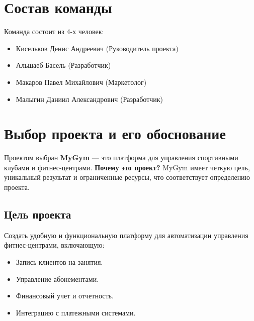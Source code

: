 \documentclass[14pt, russian]{matmex-diploma-custom}
\begin{document}

\maketitle

\section{Состав команды}
Команда состоит из 4-х человек:
\begin{itemize}
    \item Кисельков Денис Андреевич (Руководитель проекта)
    \item Альшаеб Басель (Разработчик)
    \item Макаров Павел Михайлович (Маркетолог)
    \item Малыгин Даниил Александрович (Разработчик)
\end{itemize}

\section{Выбор проекта и его обоснование}
Проектом выбран \textbf{MyGym} — это платформа для управления спортивными клубами и фитнес-центрами.\newline
\textbf{Почему это проект?} MyGym имеет четкую цель, уникальный результат и ограниченные ресурсы, что соответствует определению проекта.

\subsection{Цель проекта}
Создать удобную и функциональную платформу для автоматизации управления фитнес-центрами, включающую:
\begin{itemize}
    \item Запись клиентов на занятия.
    \item Управление абонементами.
    \item Финансовый учет и отчетность.
    \item Интеграцию с платежными системами.
\end{itemize}
\end{document}
